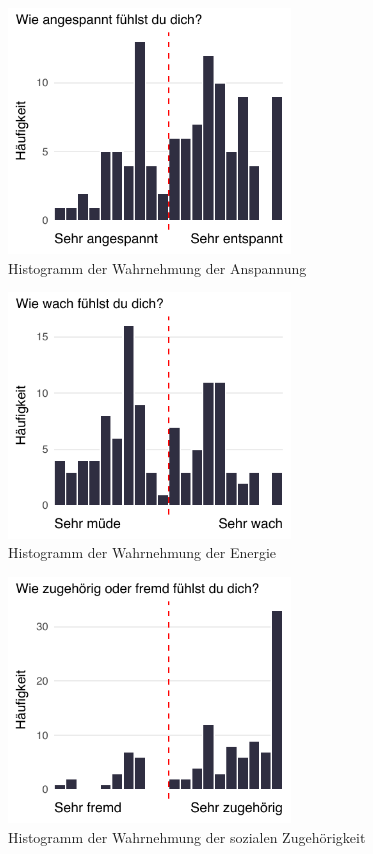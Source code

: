 \begin{appendices}
\begin{figure}[ht]
    \centering
    \includegraphics[width=7.5cm]{Analyse/Plots/sliders/tense_relaxed_hist.pdf}
    \caption{Histogramm der Wahrnehmung der Anspannung}
    \label{fig:slider_hists_tense_relaxed}
\end{figure}

\begin{figure}[ht]
    \centering
    \includegraphics[width=7.5cm]{Analyse/Plots/sliders/awake_hist.pdf}
    \caption{Histogramm der Wahrnehmung der Energie}
    \label{fig:slider_hists_awake}
\end{figure}

\begin{figure}[ht]
    \centering
    \includegraphics[width=7.5cm]{Analyse/Plots/sliders/sense_of_belonging_hist.pdf}
    \caption{Histogramm der Wahrnehmung der sozialen Zugehörigkeit}
    \label{fig:slider_hists_sense_of_belonging}
\end{figure}



\end{appendices}
